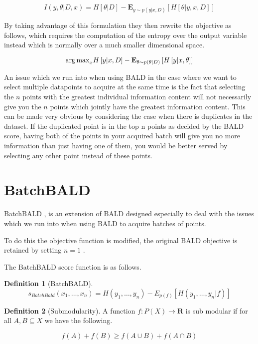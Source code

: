 \documentclass[12pt, a4paper]{report}
\theoremstyle{definition}
\theoremstyle{definition}
\newtheorem{definition}{Definition}[section]
\theoremstyle{definition}
\begin{document}
$$I \left(y, \theta| D, x \right) = H \left[ \theta | D \right] - \mathbf{E}_{y \sim p(y | x, D)} \left[ H\left[ \theta | y, x, D\right]\right]$$



By taking advantage of this formulation they then rewrite the objective as follows, which requires the computation of the entropy over the output variable instead which is normally over a much smaller dimensional space.


$${\operatorname*{arg\,max}}_x H \left[ y | x, D \right] - \mathbf{E}_{\theta \sim p(\theta | D)} \left[ H\left[ y | x, \theta \right]\right]$$


An issue which we run into when using BALD in the case where we want to select multiple datapoints to acquire at the same time is the fact that selecting the $n$ points with the greatest individual information content will not necessarily give you the $n$ points which jointly have the greatest information content. This can be made very obvious by considering the case when there is duplicates in the dataset. If the duplicated point is in the top n points as decided by the BALD score, having both of the points in your acquired batch will give you no more information than just having one of them, you would be better served by selecting any other point instead of these points.

\section{BatchBALD}
BatchBALD \cite{kirsch2019batchbald}, is an extension of BALD designed especially to deal with the issues which we run into when using BALD to acquire batches of points.

To do this the objective function is modified, the original BALD objective is retained by setting $n = 1$ .

The BatchBALD score function is as follows.


\begin{definition}[BatchBALD]
    $$s_{BatchBald} (x_1, \ldots, x_n) = H(y_1, \ldots, y_n) - E_{p(f)}\left[H(y_1, \ldots, y_n | f)\right]$$
\end{definition}


\begin{definition}[Submodularity]
    A function $f : P(X) \rightarrow \mathbf{R}$ is sub modular if for all $A,B \subseteq X$ we have the following.

    $$f(A) + f(B) \geq f\left( A \cup B \right) +  f\left(A \cap B \right) $$
\end{definition}
\end{document}
